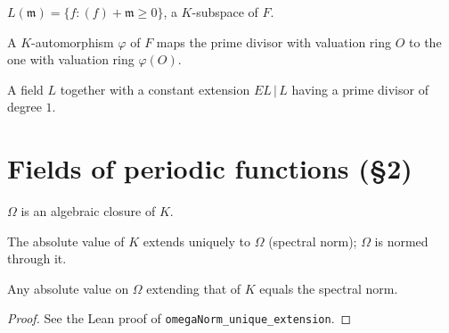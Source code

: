 \begin{definition}
\label{def:rr-space}
\leanok
$L(\mathfrak m)=\{f : (f)+\mathfrak m\ge 0\}$, a $K$-subspace of $F$.
\end{definition}

\begin{definition}
\label{def:aut-action-divisors}
\leanok
A $K$-automorphism $\varphi$ of $F$ maps the prime divisor with valuation ring $O$ to the one with valuation ring $\varphi(O)$.
\end{definition}

\begin{definition}
\label{def:splitting-data}
\leanok
A field $L$ together with a constant extension $EL\,|\,L$ having a prime divisor of degree $1$.
\end{definition}

\section{Fields of periodic functions (\S 2)}

\begin{definition}
\label{def:omega}
\leanok
$\Omega$ is an algebraic closure of $K$.
\end{definition}

\begin{definition}
\label{def:omega-norm}
\leanok
The absolute value of $K$ extends uniquely to $\Omega$ (spectral norm); $\Omega$ is normed through it.
\end{definition}

\begin{lemma}
\label{lem:ext-unique}
\leanok
Any absolute value on $\Omega$ extending that of $K$ equals the spectral norm.
\end{lemma}
\begin{proof}
\leanok
See the Lean proof of \texttt{omegaNorm\_unique\_extension}.
\end{proof}

